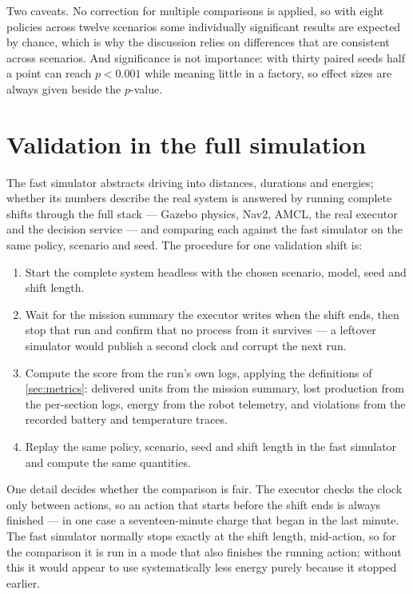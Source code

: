 Two caveats. No correction for multiple comparisons is applied, so with eight policies across
twelve scenarios some individually significant results are expected by chance, which is why the
discussion relies on differences that are consistent across scenarios. And significance is not
importance: with thirty paired seeds half a point can reach $p<0.001$ while meaning little in a
factory, so effect sizes are always given beside the $p$-value.

\section{Validation in the full simulation}
\label{sec:gazebo-setup}

The fast simulator abstracts driving into distances, durations and energies; whether its numbers
describe the real system is answered by running complete shifts through the full stack --- Gazebo
physics, Nav2, AMCL, the real executor and the decision service --- and comparing each against the
fast simulator on the same policy, scenario and seed. The procedure for one validation shift is:

\begin{enumerate}[leftmargin=*, itemsep=0.15em]
  \item Start the complete system headless with the chosen scenario, model, seed and shift length.
  \item Wait for the mission summary the executor writes when the shift ends, then stop that run
        and confirm that no process from it survives --- a leftover simulator would publish a
        second clock and corrupt the next run.
  \item Compute the score from the run's own logs, applying the definitions of
        \cref{sec:metrics}: delivered units from the mission summary, lost production from the
        per-section logs, energy from the robot telemetry, and violations from the recorded
        battery and temperature traces.
  \item Replay the same policy, scenario, seed and shift length in the fast simulator and compute
        the same quantities.
\end{enumerate}

One detail decides whether the comparison is fair. The executor checks the clock only between
actions, so an action that starts before the shift ends is always finished --- in one case a
seventeen-minute charge that began in the last minute. The fast simulator normally stops exactly at
the shift length, mid-action, so for the comparison it is run in a mode that also finishes the
running action; without this it would appear to use systematically less energy purely because it
stopped earlier.

